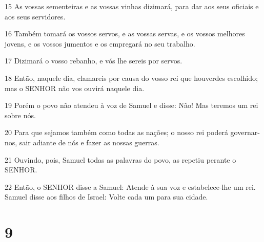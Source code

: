 \par 15 As vossas sementeiras e as vossas vinhas dizimará, para dar aos seus oficiais e aos seus servidores.
\par 16 Também tomará os vossos servos, e as vossas servas, e os vossos melhores jovens, e os vossos jumentos e os empregará no seu trabalho.
\par 17 Dizimará o vosso rebanho, e vós lhe sereis por servos.
\par 18 Então, naquele dia, clamareis por causa do vosso rei que houverdes escolhido; mas o SENHOR não vos ouvirá naquele dia.
\par 19 Porém o povo não atendeu à voz de Samuel e disse: Não! Mas teremos um rei sobre nós.
\par 20 Para que sejamos também como todas as nações; o nosso rei poderá governar-nos, sair adiante de nós e fazer as nossas guerras.
\par 21 Ouvindo, pois, Samuel todas as palavras do povo, as repetiu perante o SENHOR.
\par 22 Então, o SENHOR disse a Samuel: Atende à sua voz e estabelece-lhe um rei. Samuel disse aos filhos de Israel: Volte cada um para sua cidade.

\chapter{9}

